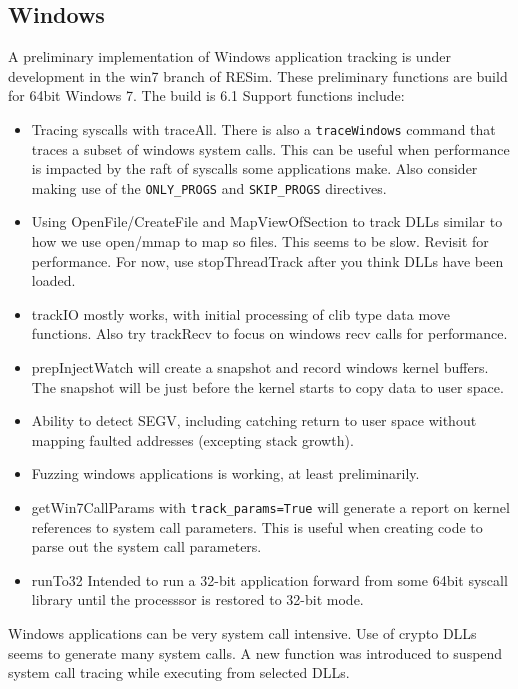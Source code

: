 \documentclass[titlepage]{article}
\begin{document}
\begin{appendices}
\section{Windows}
\label{Windows}
A preliminary implementation of Windows application tracking is under development in the win7 branch of RESim.
These preliminary functions are build for 64bit Windows 7.  The build is 6.1
Support functions include:
\begin{itemize}
\item Tracing syscalls with traceAll.  There is also a {\tt traceWindows} command that traces a subset of windows system calls.  This can be useful when performance is 
impacted by the raft of syscalls some applications make.  Also consider making use of the {\tt ONLY\_PROGS} and {\tt SKIP\_PROGS} directives.

\item Using OpenFile/CreateFile and MapViewOfSection to track DLLs similar to how we use open/mmap to map so files.  This seems to be slow.
Revisit for performance.  For now, use stopThreadTrack after you think DLLs have been loaded.

\item trackIO mostly works, with initial processing of clib type data move functions.  Also try trackRecv to focus on windows recv calls for performance.  

\item prepInjectWatch will create a snapshot and record windows kernel buffers.  The snapshot will be just before the kernel starts to copy data to user space.

\item Ability to detect SEGV, including catching return to user space without mapping faulted addresses (excepting stack growth).

\item Fuzzing windows applications is working, at least preliminarily.

\item getWin7CallParams with {\tt track\_params=True} will generate a report on kernel references to system call parameters.  This is useful when creating code to parse out
the system call parameters.

\item runTo32 Intended to run a 32-bit application forward from some 64bit syscall library until the processsor is restored to 32-bit mode.
\end{itemize}

Windows applications can be very system call intensive.  Use of crypto DLLs seems to generate many system calls.  A new function was introduced to suspend 
system call tracing while executing from selected DLLs.


\end{appendices}
\end{document}
